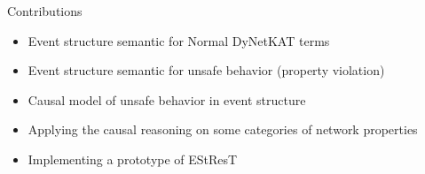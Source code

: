 \begin{frame}{Contributions}
    \begin{itemize}
        \item Event structure semantic for Normal DyNetKAT terms
        \item Event structure semantic for unsafe behavior (property violation)
        \item Causal model of unsafe behavior in event structure
        \item Applying the causal reasoning on some categories of network properties
        \item Implementing a prototype of EStResT
    \end{itemize}
\end{frame}
